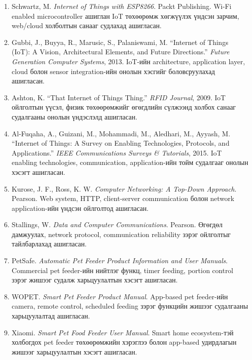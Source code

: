 \documentclass[12pt,a4paper]{report}
\begin{document}
\begin{enumerate}[leftmargin=1.2cm]
  \item Schwartz, M. \textit{Internet of Things with ESP8266}. Packt Publishing. Wi-Fi enabled microcontroller ашиглан IoT төхөөрөмж хөгжүүлэх үндсэн зарчим, web/cloud холболтын санааг судлахад ашигласан.

  \item Gubbi, J., Buyya, R., Marusic, S., Palaniswami, M. ``Internet of Things (IoT): A Vision, Architectural Elements, and Future Directions.'' \textit{Future Generation Computer Systems}, 2013. IoT-ийн architecture, application layer, cloud болон sensor integration-ийн онолын хэсгийг боловсруулахад ашигласан.

  \item Ashton, K. ``That Internet of Things Thing.'' \textit{RFID Journal}, 2009. IoT ойлголтын үүсэл, физик төхөөрөмжийг өгөгдлийн сүлжээнд холбох санааг судалгааны онолын үндэслэлд ашигласан.

  \item Al-Fuqaha, A., Guizani, M., Mohammadi, M., Aledhari, M., Ayyash, M. ``Internet of Things: A Survey on Enabling Technologies, Protocols, and Applications.'' \textit{IEEE Communications Surveys \& Tutorials}, 2015. IoT enabling technologies, communication, application-ийн тойм судалгааг онолын хэсэгт ашигласан.

  \item Kurose, J. F., Ross, K. W. \textit{Computer Networking: A Top-Down Approach}. Pearson. Web system, HTTP, client-server communication болон network application-ийн үндсэн ойлголтод ашигласан.

  \item Stallings, W. \textit{Data and Computer Communications}. Pearson. Өгөгдөл дамжуулах, network protocol, communication reliability зэрэг ойлголтыг тайлбарлахад ашигласан.

  \item PetSafe. \textit{Automatic Pet Feeder Product Information and User Manuals}. Commercial pet feeder-ийн нийтлэг функц, timer feeding, portion control зэрэг жишээг судалж харьцуулалтын хэсэгт ашигласан.

  \item WOPET. \textit{Smart Pet Feeder Product Manual}. App-based pet feeder-ийн camera, remote control, scheduled feeding зэрэг функцийн жишээг судалгааны харьцуулалтад ашигласан.

  \item Xiaomi. \textit{Smart Pet Food Feeder User Manual}. Smart home ecosystem-тэй холбогдох pet feeder төхөөрөмжийн хэрэглээ болон app-based удирдлагын жишээг харьцуулалтын хэсэгт ашигласан.


\end{enumerate}
\end{document}
